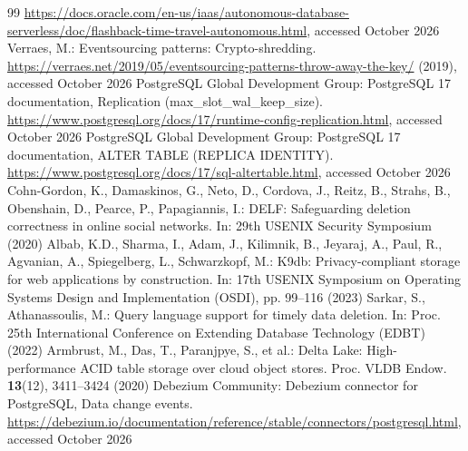 \documentclass[runningheads]{llncs}
\begin{document}
\begin{thebibliography}{99}
\url{https://docs.oracle.com/en-us/iaas/autonomous-database-serverless/doc/flashback-time-travel-autonomous.html},
accessed October 2026
 Verraes, M.: Eventsourcing patterns: Crypto-shredding.
\url{https://verraes.net/2019/05/eventsourcing-patterns-throw-away-the-key/}
(2019), accessed October 2026
 PostgreSQL Global Development Group: PostgreSQL 17
documentation, Replication (max\_slot\_wal\_keep\_size).
\url{https://www.postgresql.org/docs/17/runtime-config-replication.html},
accessed October 2026
 PostgreSQL Global Development Group: PostgreSQL 17
documentation, ALTER TABLE (REPLICA IDENTITY).
\url{https://www.postgresql.org/docs/17/sql-altertable.html}, accessed October
2026
 Cohn-Gordon, K., Damaskinos, G., Neto, D., Cordova, J.,
Reitz, B., Strahs, B., Obenshain, D., Pearce, P., Papagiannis, I.: DELF:
Safeguarding deletion correctness in online social networks. In: 29th USENIX
Security Symposium (2020)
 Albab, K.D., Sharma, I., Adam, J., Kilimnik, B., Jeyaraj, A.,
Paul, R., Agvanian, A., Spiegelberg, L., Schwarzkopf, M.: K9db:
Privacy-compliant storage for web applications by construction. In: 17th USENIX
Symposium on Operating Systems Design and Implementation (OSDI), pp. 99--116
(2023)
 Sarkar, S., Athanassoulis, M.: Query language support for
timely data deletion. In: Proc. 25th International Conference on Extending
Database Technology (EDBT) (2022)
 Armbrust, M., Das, T., Paranjpye, S., et al.: Delta Lake:
High-performance ACID table storage over cloud object stores. Proc. VLDB Endow.
\textbf{13}(12), 3411--3424 (2020)
 Debezium Community: Debezium connector for PostgreSQL, Data
change events.
\url{https://debezium.io/documentation/reference/stable/connectors/postgresql.html},
accessed October 2026
\end{thebibliography}
\end{document}
